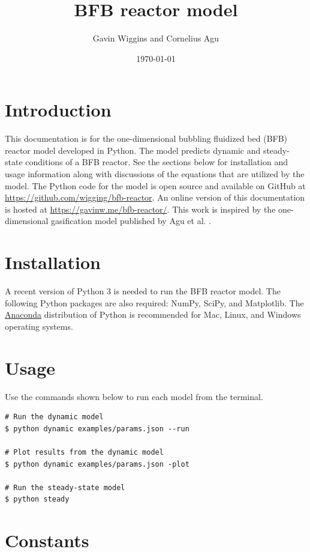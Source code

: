 \documentclass[12pt,titlepage]{article}
\title{\textbf{BFB reactor model}}
\author{Gavin Wiggins and Cornelius Agu}
\date{\today}
\begin{document}
\maketitle

\tableofcontents

\section{Introduction}

This documentation is for the one-dimensional bubbling fluidized bed (BFB) reactor model developed in Python. The model predicts dynamic and steady-state conditions of a BFB reactor. See the sections below for installation and usage information along with discussions of the equations that are utilized by the model. The Python code for the model is open source and available on GitHub at \url{https://github.com/wigging/bfb-reactor}. An online version of this documentation is hosted at \url{https://gavinw.me/bfb-reactor/}. This work is inspired by the one-dimensional gasification model published by Agu et al. \cite{Agu-2019f}.

\section{Installation}

A recent version of Python 3 is needed to run the BFB reactor model. The following Python packages are also required: NumPy, SciPy, and Matplotlib. The \href{https://www.anaconda.com/products/individual}{Anaconda} distribution of Python is recommended for Mac, Linux, and Windows operating systems.

\section{Usage}

Use the commands shown below to run each model from the terminal.

\begin{verbatim}
# Run the dynamic model
$ python dynamic examples/params.json --run

# Plot results from the dynamic model
$ python dynamic examples/params.json -plot

# Run the steady-state model
$ python steady
\end{verbatim}

\section{Constants}
\end{document}
